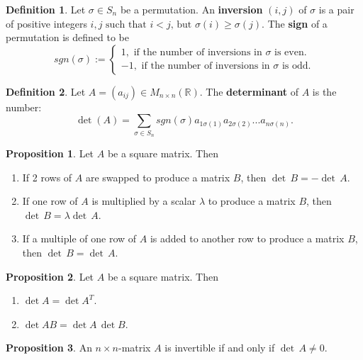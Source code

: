 \documentclass[11pt,a4paper]{article}
\newcommand\R{\mathbb{R}}
\newcommand\st{\text{ such that }}
\newcommand\inMatrixSq{\in M_{n \times n} (\R)}
\theoremstyle{definition}
\newtheorem{definition}{Definition}
\newtheorem{proposition}{Proposition}
\begin{document}
\begin{definition}
    Let $\sigma \in S_n $ be a permutation. An \textbf{inversion} $(i, j)$ of $\sigma$ is a pair of positive integers $i, j \st i < j \text{, but } \sigma(i) \geq \sigma(j) $.
    The \textbf{sign} of a permutation is defined to be 
    \[sgn(\sigma) := \begin{cases}
        1, \text{ if the number of inversions in } \sigma \text{ is even.} \\
        -1, \text{ if the number of inversions in } \sigma \text{ is odd.}
    \end{cases}\]
\end{definition}

\begin{definition}
    Let $ A = (a_{ij}) \inMatrixSq{} $. The \textbf{determinant} of $ A $ is the number:
    \[ \det(A) = \sum_{\sigma \in S_n} sgn(\sigma)a_{1\sigma(1)}a_{2\sigma(2)}...a_{n\sigma(n)}.\]
\end{definition}

\begin{proposition}
    Let $ A $ be a square matrix. Then
    \begin{enumerate}
        \item If 2 rows of $ A $ are swapped to produce a matrix $ B $, then $ \det \, B = - \det \, A $.
        \item If one row of $ A $ is multiplied by a scalar $ \lambda $ to produce a matrix $ B $, then $ \det \, B = \lambda \det \, A $.
        \item If a multiple of one row of $A$ is added to another row to produce a matrix $ B $, then $ \det \, B = \det \, A $.
    \end{enumerate}
\end{proposition}

\begin{proposition}
    Let $ A $ be a square matrix. Then
    \begin{enumerate}
        \item $ \det A = \det A^T $.
        \item $ \det AB = \det A \, \det B $. 
    \end{enumerate}
\end{proposition}

\begin{proposition}
    An $ n \times n $-matrix $ A $ is invertible if and only if $ \det \, A \neq 0 $.
\end{proposition}
\end{document}
